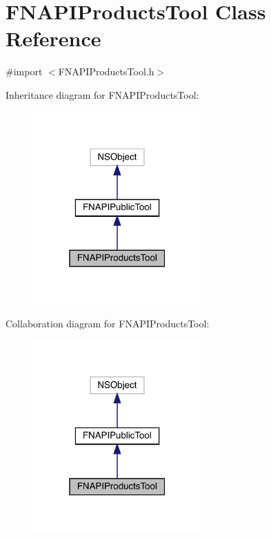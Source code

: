\hypertarget{interface_f_n_a_p_i_products_tool}{}\section{F\+N\+A\+P\+I\+Products\+Tool Class Reference}
\label{interface_f_n_a_p_i_products_tool}


{\ttfamily \#import $<$F\+N\+A\+P\+I\+Products\+Tool.\+h$>$}



Inheritance diagram for F\+N\+A\+P\+I\+Products\+Tool\+:\nopagebreak
\begin{figure}[H]
\begin{center}
\leavevmode
\includegraphics[width=183pt]{interface_f_n_a_p_i_products_tool__inherit__graph}
\end{center}
\end{figure}


Collaboration diagram for F\+N\+A\+P\+I\+Products\+Tool\+:\nopagebreak
\begin{figure}[H]
\begin{center}
\leavevmode
\includegraphics[width=183pt]{interface_f_n_a_p_i_products_tool__coll__graph}
\end{center}
\end{figure}
